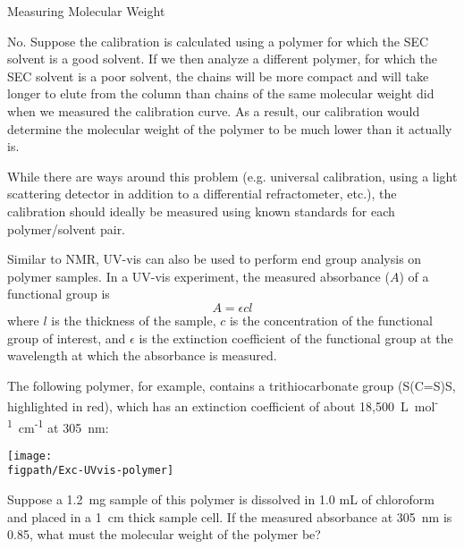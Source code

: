 \begin{activity}{Measuring Molecular Weight}
\begin{ctqs}
			\begin{solution}[1.5in]
				No.  Suppose the calibration is calculated using a polymer for which the SEC solvent is a good solvent.  If we then analyze a different polymer, for which the SEC solvent is a poor solvent, the chains will be more compact and will take longer to elute from the column than chains of the same molecular weight did when we measured the calibration curve.  As a result, our calibration would determine the molecular weight of the polymer to be much lower than it actually is.
				
				While there are ways around this problem (e.g. universal calibration, using a light scattering detector in addition to a differential refractometer, etc.), the calibration should ideally be measured using known standards for each polymer/solvent pair.
			\end{solution}
	
	
	
\end{ctqs}


\begin{exercises}

	\exercise Similar to NMR, UV-vis can also be used to perform end group analysis on polymer samples.  In a UV-vis experiment, the measured absorbance ($A$) of a functional group is
		\begin{equation*}
			A = \epsilon c l
		\end{equation*}
		where $l$ is the thickness of the sample, $c$ is the concentration of the functional group of interest, and $\epsilon$ is the extinction coefficient of the functional group at the wavelength at which the absorbance is measured.
		
		The following polymer, for example, contains a trithiocarbonate group (S(C=S)S,  highlighted in red), which has an extinction coefficient of about 18,500~L~mol\textsuperscript{-1}~cm\textsuperscript{-1} at 305~nm:
		
			\centerline{\texttt{[image: \\figpath/Exc-UVvis-polymer]}}
		
		Suppose a 1.2~mg sample of this polymer is dissolved in 1.0 mL of chloroform and placed in a 1~cm thick sample cell.  If the measured absorbance at 305~nm is 0.85, what must the molecular weight of the polymer be?
		

\end{exercises}
\end{activity}
